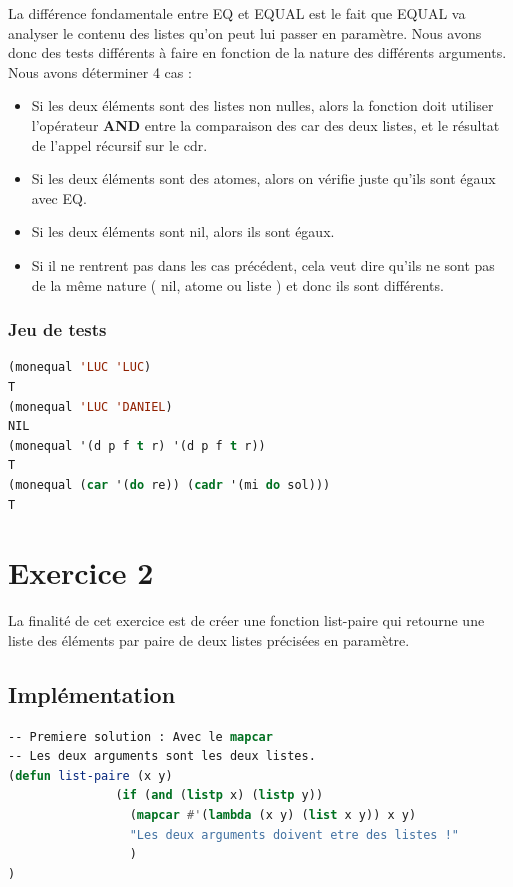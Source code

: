 \documentclass[a4paper,10pt]{report}
\begin{document}
	  La différence fondamentale entre EQ et EQUAL est le fait que EQUAL va analyser le contenu des listes qu'on peut lui passer en paramètre. Nous avons donc des tests différents
	  à faire en fonction de la nature des différents arguments. Nous avons déterminer 4 cas :
	  \begin{itemize}
	   \item Si les deux éléments sont des listes non nulles, alors la fonction doit utiliser l'opérateur \textbf{AND} entre la comparaison des car des deux listes, et le résultat de l'appel récursif sur le cdr.
	   \item Si les deux éléments sont des atomes, alors on vérifie juste qu'ils sont égaux avec EQ.
	   \item Si les deux éléments sont nil, alors ils sont égaux.
	   \item Si il ne rentrent pas dans les cas précédent, cela veut dire qu'ils ne sont pas de la même nature ( nil, atome ou liste ) et donc ils sont différents.
	  \end{itemize}
	  \subsection{Jeu de tests}
	  \begin{lstlisting}[language=Lisp]
(monequal 'LUC 'LUC)
T
(monequal 'LUC 'DANIEL)
NIL
(monequal '(d p f t r) '(d p f t r))
T
(monequal (car '(do re)) (cadr '(mi do sol)))
T

		 \end{lstlisting}
	  \chapter{Exercice 2}
	  
	  
	    La finalité de cet exercice est de créer une fonction list-paire qui retourne une liste des éléments par paire de deux listes précisées en paramètre.
	  \section{Implémentation}
	  \begin{lstlisting}[language=Lisp]
-- Premiere solution : Avec le mapcar
-- Les deux arguments sont les deux listes.
(defun list-paire (x y)
               (if (and (listp x) (listp y))
                 (mapcar #'(lambda (x y) (list x y)) x y)
                 "Les deux arguments doivent etre des listes !"
                 )
)
	  \end{lstlisting}
\end{document}
